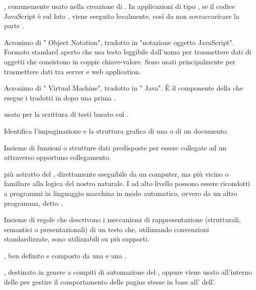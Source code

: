 { , comunemente usato nella creazione di . In applicazioni di tipo , se il codice JavaScript è sul lato , viene eseguito localmente, così da non sovraccaricare la parte .}

{Acronimo di " Object Notation", tradotto in "notazione oggetto JavaScript". Formato standard aperto che usa testo leggibile dall'uomo per trasmettere dati di oggetti che consistono in coppie chiave-valore. Sono usati principalmente per trasmettere dati tra server e web application.}

{Acronimo di " Virtual Machine", tradotto in " Java". \`{E} il componente della  che esegue i  tradotti in  dopo una prima .}




{ usato per la scrittura di testi basato sul  .}

{Identifica l'impaginazione e la struttura grafica di una  o di un documento.}

{Insieme di funzioni o strutture dati predisposte per essere collegate ad un   attraverso opportuno collegamento.}

{ più astratto del , direttamente eseguibile da un computer, ma più vicino o familiare alla logica del nostro  naturale. I  ad alto livello possono essere ricondotti a programmi in linguaggio macchina in modo automatico, ovvero da un altro programma, detto .}

{Insieme di regole che descrivono i meccanismi di rappresentazione (strutturali, semantici o presentazionali) di un testo che, utilizzando convenzioni standardizzate, sono utilizzabili su più supporti.}

{, ben definito e composto da una  e una .}

{, destinato in genere a compiti di automazione del , oppure viene usato all'interno delle  per gestire il comportamento delle pagine stesse in base all'  dell'.}

